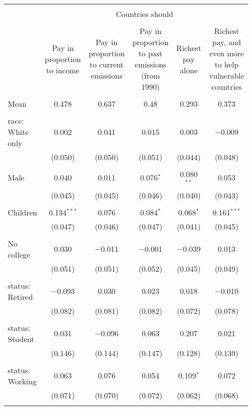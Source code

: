 
\begin{tabular}{@{\extracolsep{5pt}}lccccc} 
\\[-1.8ex]\hline 
\hline \\[-1.8ex] 
 & \multicolumn{5}{c}{Countries should} \\ 
\cline{2-6} 
\\[-1.8ex] & Pay in proportion to income & Pay in proportion to current emissions & Pay in proportion to past emissions (from 1990) & Richest pay alone & Richest pay, and even more to help vulnerable countries \\ 
\hline \\[-1.8ex] 
 Mean & 0.478 & 0.637 & 0.48 & 0.293 & 0.373  \\ \hline \\[-1.8ex] race: White only & 0.002 & 0.041 & 0.015 & 0.003 & $-$0.009 \\ 
  & (0.050) & (0.050) & (0.051) & (0.044) & (0.048) \\ 
  & & & & & \\ 
 Male & 0.040 & 0.011 & 0.076$^{*}$ & 0.080$^{**}$ & 0.053 \\ 
  & (0.045) & (0.045) & (0.046) & (0.040) & (0.043) \\ 
  & & & & & \\ 
 Children & 0.134$^{***}$ & 0.076 & 0.084$^{*}$ & 0.068$^{*}$ & 0.161$^{***}$ \\ 
  & (0.047) & (0.046) & (0.047) & (0.041) & (0.045) \\ 
  & & & & & \\ 
 No college & 0.030 & $-$0.011 & $-$0.001 & $-$0.039 & 0.013 \\ 
  & (0.051) & (0.051) & (0.052) & (0.045) & (0.049) \\ 
  & & & & & \\ 
 status: Retired & $-$0.093 & 0.030 & 0.023 & 0.018 & $-$0.010 \\ 
  & (0.082) & (0.081) & (0.082) & (0.072) & (0.078) \\ 
  & & & & & \\ 
 status: Student & 0.031 & $-$0.096 & 0.063 & 0.207 & 0.021 \\ 
  & (0.146) & (0.144) & (0.147) & (0.128) & (0.139) \\ 
  & & & & & \\ 
 status: Working & 0.063 & 0.076 & 0.054 & 0.109$^{*}$ & 0.072 \\ 
  & (0.071) & (0.070) & (0.072) & (0.062) & (0.068) \\ 
  & & & & & \\ 

\end{tabular}
